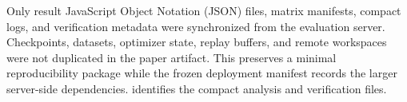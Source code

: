 Only result JavaScript Object Notation (JSON) files, matrix manifests, compact logs, and verification
metadata were synchronized from the evaluation server. Checkpoints, datasets,
optimizer state, replay buffers, and remote workspaces were not duplicated in
the paper artifact. This preserves a minimal reproducibility package while the
frozen deployment manifest records the larger server-side dependencies.
 identifies the compact analysis and verification files.

